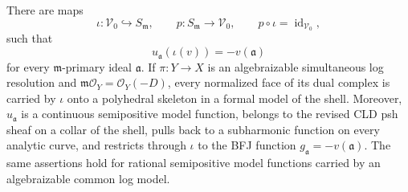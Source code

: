 \begin{lemma}\label{lem:local-cld-gauss-core}
There are maps
\[
 \iota:\mathcal V_0\hookrightarrow S_{\mathfrak m},
 \qquad
 p:S_{\mathfrak m}\longrightarrow\mathcal V_0,
 \qquad p\circ\iota=\operatorname{id}_{\mathcal V_0},
\]
such that
\[
                 u_{\mathfrak a}(\iota(v))=-v(\mathfrak a)
\tag{70.39}\label{eq:local-cld-gauss-ideal}
\]
for every \(\mathfrak m\)-primary ideal \(\mathfrak a\). If
\(\pi:Y\to X\) is an algebraizable simultaneous log resolution and
\(\mathfrak m\mathcal O_Y=\mathcal O_Y(-D)\), every normalized face of its
dual complex is carried by \(\iota\) onto a polyhedral skeleton in a formal
model of the shell. Moreover, \(u_{\mathfrak a}\) is a continuous
semipositive model function, belongs to the revised CLD psh sheaf on a
collar of the shell, pulls back to a subharmonic function on every analytic
curve, and restricts through \(\iota\) to the BFJ function
\(g_{\mathfrak a}=-v(\mathfrak a)\). The same assertions hold for rational
semipositive model functions carried by an algebraizable common log model.
\end{lemma}


